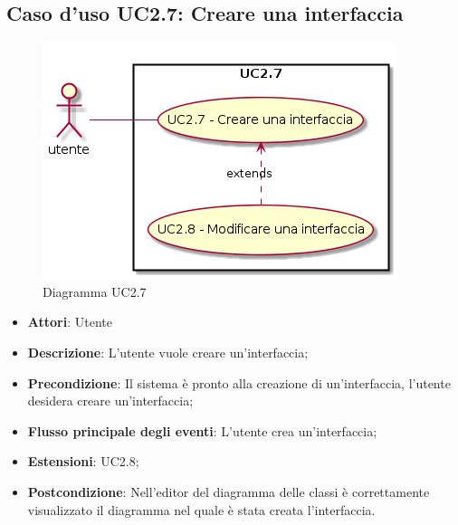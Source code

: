 \documentclass[../AnalisiDeiRequisiti.tex]{subfiles}
\begin{document}
		\subsection{Caso d'uso UC2.7: Creare una interfaccia}
		\begin{figure} [H]
			\centering
			\includegraphics[scale=0.45]{./Figures/UC2_7.png}
			\caption{Diagramma UC2.7}\label{}
		\end{figure}
		\begin{itemize}
			\item \textbf{Attori}: Utente
			\item \textbf{Descrizione}: L'utente vuole creare un'interfaccia;
			\item \textbf{Precondizione}: Il sistema è pronto alla creazione di un'interfaccia, l'utente desidera creare un'interfaccia;
			\item \textbf{Flusso principale degli eventi}: L'utente crea un'interfaccia;
			\item \textbf{Estensioni}: UC2.8;
			\item \textbf{Postcondizione}: Nell'editor del diagramma delle classi è correttamente visualizzato il diagramma nel quale è stata creata l'interfaccia.
		\end{itemize}
\end{document}
